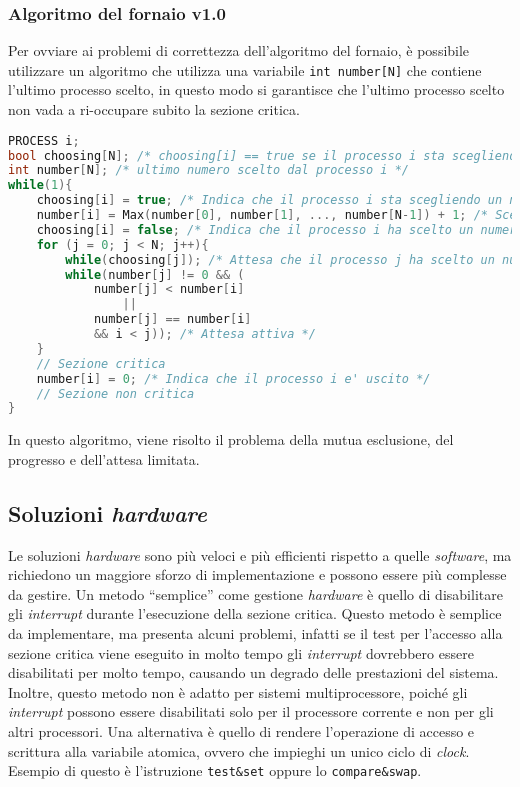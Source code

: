             \subsubsection{Algoritmo del fornaio v1.0}
                Per ovviare ai problemi di correttezza dell'algoritmo del fornaio, è possibile utilizzare un algoritmo che utilizza una variabile \texttt{int number[N]} che contiene l'ultimo processo scelto, in questo modo si garantisce che l'ultimo processo scelto non vada a ri-occupare subito la sezione critica.
                \begin{lstlisting}[language=C++,basicstyle=\footnotesize]
PROCESS i;
bool choosing[N]; /* choosing[i] == true se il processo i sta scegliendo un numero */
int number[N]; /* ultimo numero scelto dal processo i */
while(1){
    choosing[i] = true; /* Indica che il processo i sta scegliendo un numero */
    number[i] = Max(number[0], number[1], ..., number[N-1]) + 1; /* Sceglie un numero */
    choosing[i] = false; /* Indica che il processo i ha scelto un numero */
    for (j = 0; j < N; j++){
        while(choosing[j]); /* Attesa che il processo j ha scelto un numero */
        while(number[j] != 0 && (
            number[j] < number[i] 
                ||
            number[j] == number[i]
            && i < j)); /* Attesa attiva */
    }
    // Sezione critica
    number[i] = 0; /* Indica che il processo i e' uscito */
    // Sezione non critica
}
                \end{lstlisting}
                In questo algoritmo, viene risolto il problema della mutua esclusione, del progresso e dell'attesa limitata.

    \subsection{Soluzioni \textit{hardware}}
        Le soluzioni \textit{hardware} sono più veloci e più efficienti rispetto a quelle \textit{software}, ma richiedono un maggiore sforzo di implementazione e possono essere più complesse da gestire. Un metodo ``semplice'' come gestione \textit{hardware} è quello di disabilitare gli \textit{interrupt} durante l'esecuzione della sezione critica. Questo metodo è semplice da implementare, ma presenta alcuni problemi, infatti se il test per l'accesso alla sezione critica viene eseguito in molto tempo gli \textit{interrupt} dovrebbero essere disabilitati per molto tempo, causando un degrado delle prestazioni del sistema. Inoltre, questo metodo non è adatto per sistemi multiprocessore, poiché gli \textit{interrupt} possono essere disabilitati solo per il processore corrente e non per gli altri processori. Una alternativa è quello di rendere l'operazione di accesso e scrittura alla variabile atomica, ovvero che impieghi un unico ciclo di \textit{clock}. Esempio di questo è l'istruzione \texttt{test\&set} oppure lo \texttt{compare\&swap}.
